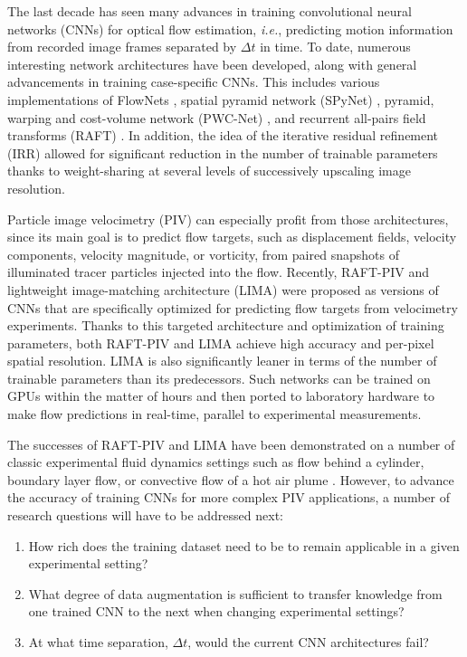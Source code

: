 \documentclass[a4paper,fleqn]{cas-dc}
\begin{document}
The last decade has seen many advances in training convolutional neural networks (CNNs) for optical flow estimation, \textit{i.e.}, predicting motion information from recorded image frames separated by $\Delta t$ in time. To date, numerous interesting network architectures have been developed, along with general advancements in training case-specific CNNs. This includes various implementations of FlowNets \citep{dosovitskiy2015flownet, ilg2017flownet, hui2018liteflownet}, spatial pyramid network (SPyNet) \cite{ranjan2017optical}, pyramid, warping and cost-volume network (PWC-Net) \cite{sun2018pwc}, and recurrent all-pairs field transforms (RAFT) \cite{teed2020raft}. In addition, the idea of the iterative residual refinement (IRR) \cite{hur2019iterative} allowed for significant reduction in the number of trainable parameters thanks to weight-sharing at several levels of successively upscaling image resolution.

Particle image velocimetry (PIV) can especially profit from those architectures, since its main goal is to predict flow targets, such as displacement fields, velocity components, velocity magnitude, or vorticity, from paired snapshots of illuminated tracer particles injected into the flow. Recently, RAFT-PIV \cite{lagemann2021deep} and lightweight image-matching architecture (LIMA) \citep{manickathan2023lightweight} were proposed as versions of CNNs that are specifically optimized for predicting flow targets from velocimetry experiments. Thanks to this targeted architecture and optimization of training parameters, both RAFT-PIV and LIMA achieve high accuracy and per-pixel spatial resolution. LIMA is also significantly leaner in terms of the number of trainable parameters than its predecessors. Such networks can be trained on GPUs within the matter of hours and then ported to laboratory hardware to make flow predictions in real-time, parallel to experimental measurements.

The successes of RAFT-PIV and LIMA have been demonstrated on a number of classic experimental fluid dynamics settings such as flow behind a cylinder, boundary layer flow, or convective flow of a hot air plume \cite{mucignat2023lightweight}. However, to advance the accuracy of training CNNs for more complex PIV applications, a number of research questions will have to be addressed next:
\begin{enumerate}
\item How rich does the training dataset need to be to remain applicable in a given experimental setting?
\item What degree of data augmentation is sufficient to transfer knowledge from one trained CNN to the next when changing experimental settings?
\item At what time separation, $\Delta t$, would the current CNN architectures fail?
\end{enumerate}
\end{document}
